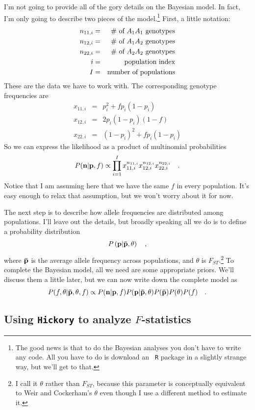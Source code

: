 \documentclass[12pt]{article}
\begin{document}
I'm not going to provide all of the gory details on the Bayesian
model. In fact, I'm only going to describe two pieces of the
model.\footnote{The good news is that to do the Bayesian analyses you
  don't have to write any code. All you have to do is download an {\tt
    R} package in a slightly strange way, but we'll get to that.}
First, a little notation:
\begin{eqnarray*}
n_{11,i} &=& \hbox{\# of $A_1A_1$ genotypes} \\
n_{12,i} &=& \hbox{\# of $A_1A_2$ genotypes} \\
n_{22,i} &=& \hbox{\# of $A_2A_2$ genotypes} \\
i         &=& \hbox{population index} \\
I         &=& \hbox{number of populations} \\
\end{eqnarray*}
These are the data we have to work with. The corresponding genotype
frequencies are
\begin{eqnarray*}
x_{11,i} &=& p_{i}^2 + fp_{i}(1-p_{i}) \\
x_{12,i} &=& 2p_{i}(1-p_{i})(1-f) \\
x_{22,i} &=& (1-p_{i})^2 + fp_{i}(1-p_{i})
\end{eqnarray*}
So we can express the likelihood %
as a product of multinomial probabilities
\[
P({\bf n}|{\bf p},f) \propto \prod_{i=1}^I x_{11,i}^{n_{11,i}}
x_{12,i}^{n_{12,i}} x_{22,i}^{n_{22,i}} \quad .
\]
Notice that I am assuming here that we have the same $f$ in every
population. It's easy enough to relax that assumption, but we won't
worry about it for now.

The next step is to describe how allele frequencies are distributed
among populations. I'll leave out the details, but broadly speaking
all we do is to define a probability distribution
\[
P\left(\bf p|{\bf\bar p}, \theta\right) \quad ,
\]
where $\bf\bar p$ is the average allele frequency across populations,
and $\theta$ is $F_{ST}$.\footnote{I call it $\theta$ rather than
  $F_{ST}$, because this parameter is conceptually equivalent to Weir
  and Cockerham's $\theta$ even though I use a different method to
  estimate it.}
To complete the Bayesian model, all we need
are some appropriate priors. We'll discuss them a little
later, but we can now write down the complete model as
\[
P(f,\theta|{\bf\bar p},\theta,f) \propto
P({\bf n}|{\bf p},f) P({\bf p}|{\bf\bar p},\theta) P({\bf\bar
  p})P(\theta)P(f) \quad .
\]

\subsection*{Using {\tt Hickory} to analyze $F$-statistics}
\end{document}
